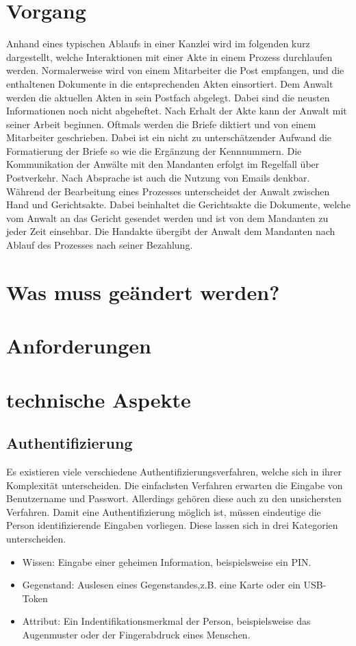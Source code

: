 \section{Vorgang}
Anhand eines typischen Ablaufs in einer Kanzlei wird im folgenden kurz dargestellt, welche Interaktionen mit einer Akte in einem Prozess durchlaufen werden.
Normalerweise wird von einem Mitarbeiter die Post empfangen, und die enthaltenen Dokumente in die entsprechenden Akten einsortiert. Dem Anwalt werden die aktuellen Akten in sein Postfach abgelegt. Dabei sind die neusten Informationen noch nicht abgeheftet. Nach Erhalt der Akte kann der Anwalt mit seiner Arbeit beginnen. Oftmals werden die Briefe diktiert und von einem Mitarbeiter geschrieben. Dabei ist ein nicht zu unterschätzender Aufwand die Formatierung der Briefe so wie die Ergänzung der Kennnummern.
Die Kommunikation der Anwälte mit den Mandanten erfolgt im Regelfall über Postverkehr. Nach Absprache ist auch die Nutzung von Emails denkbar.
Während der Bearbeitung eines Prozesses unterscheidet der Anwalt zwischen Hand und Gerichtsakte. Dabei beinhaltet die Gerichtsakte die Dokumente, welche vom Anwalt an das Gericht gesendet werden und ist von dem Mandanten zu jeder Zeit einsehbar. Die Handakte übergibt der Anwalt dem Mandanten nach Ablauf des Prozesses nach seiner Bezahlung.
	  
\section{Was muss geändert werden?}

\section{Anforderungen}

\section{technische Aspekte}
\subsection*{Authentifizierung}
Es existieren viele verschiedene Authentifizierungsverfahren, welche sich in ihrer Komplexität unterscheiden. Die einfachsten Verfahren erwarten die Eingabe von Benutzername und Passwort. Allerdings gehören diese auch zu den unsichersten Verfahren. Damit eine Authentifizierung möglich ist, müssen eindeutige die Person identifizierende Eingaben vorliegen. Diese lassen sich in drei Kategorien unterscheiden.
\begin{itemize}
\item Wissen: Eingabe einer geheimen Information, beispielsweise ein PIN.
\item Gegenstand: Auslesen eines Gegenstandes,z.B. eine Karte oder ein USB-Token
\item Attribut: Ein Indentifikationsmerkmal der Person, beispielsweise das Augenmuster oder der Fingerabdruck eines Menschen.
\end{itemize}
